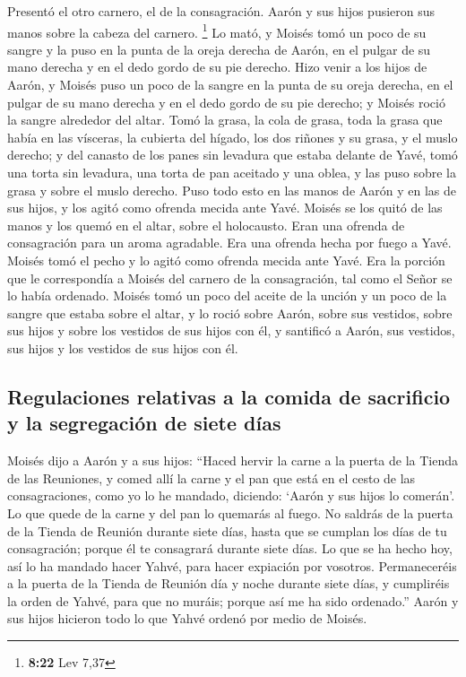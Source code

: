 \begin{paracol}{2}
 Presentó el otro carnero, el de la consagración. Aarón y
sus hijos pusieron sus manos sobre la cabeza del carnero. \footnote{\textbf{8:22}
  Lev 7,37}  Lo mató, y Moisés tomó un poco de su sangre
y la puso en la punta de la oreja derecha de Aarón, en el pulgar de su
mano derecha y en el dedo gordo de su pie derecho.  Hizo
venir a los hijos de Aarón, y Moisés puso un poco de la sangre en la
punta de su oreja derecha, en el pulgar de su mano derecha y en el dedo
gordo de su pie derecho; y Moisés roció la sangre alrededor del altar.
 Tomó la grasa, la cola de grasa, toda la grasa que había
en las vísceras, la cubierta del hígado, los dos riñones y su grasa, y
el muslo derecho;  y del canasto de los panes sin
levadura que estaba delante de Yavé, tomó una torta sin levadura, una
torta de pan aceitado y una oblea, y las puso sobre la grasa y sobre el
muslo derecho.  Puso todo esto en las manos de Aarón y en
las de sus hijos, y los agitó como ofrenda mecida ante Yavé.
 Moisés se los quitó de las manos y los quemó en el
altar, sobre el holocausto. Eran una ofrenda de consagración para un
aroma agradable. Era una ofrenda hecha por fuego a Yavé. 
Moisés tomó el pecho y lo agitó como ofrenda mecida ante Yavé. Era la
porción que le correspondía a Moisés del carnero de la consagración, tal
como el Señor se lo había ordenado.  Moisés tomó un poco
del aceite de la unción y un poco de la sangre que estaba sobre el
altar, y lo roció sobre Aarón, sobre sus vestidos, sobre sus hijos y
sobre los vestidos de sus hijos con él, y santificó a Aarón, sus
vestidos, sus hijos y los vestidos de sus hijos con él.

\hypertarget{regulaciones-relativas-a-la-comida-de-sacrificio-y-la-segregaciuxf3n-de-siete-duxedas}{%
\subsection{Regulaciones relativas a la comida de sacrificio y la
segregación de siete
días}\label{regulaciones-relativas-a-la-comida-de-sacrificio-y-la-segregaciuxf3n-de-siete-duxedas}}

 Moisés dijo a Aarón y a sus hijos: ``Haced hervir la
carne a la puerta de la Tienda de las Reuniones, y comed allí la carne y
el pan que está en el cesto de las consagraciones, como yo lo he
mandado, diciendo: `Aarón y sus hijos lo comerán'.  Lo
que quede de la carne y del pan lo quemarás al fuego.  No
saldrás de la puerta de la Tienda de Reunión durante siete días, hasta
que se cumplan los días de tu consagración; porque él te consagrará
durante siete días.  Lo que se ha hecho hoy, así lo ha
mandado hacer Yahvé, para hacer expiación por vosotros. 
Permaneceréis a la puerta de la Tienda de Reunión día y noche durante
siete días, y cumpliréis la orden de Yahvé, para que no muráis; porque
así me ha sido ordenado.''  Aarón y sus hijos hicieron
todo lo que Yahvé ordenó por medio de Moisés.


\end{paracol}
